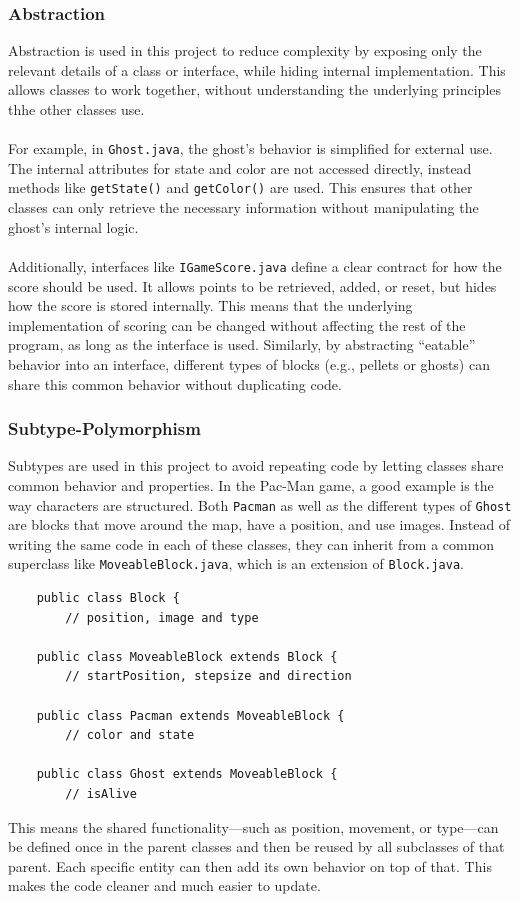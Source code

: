 \documentclass[a4paper,5pt]{article}
\begin{document}
\subsubsection{Abstraction}
\label{sec:abstraction}
Abstraction is used in this project to reduce complexity by exposing only the relevant details of a class or interface, while hiding internal implementation. This allows classes to work together, without understanding the underlying principles thhe other classes use.
\\\\
For example, in \texttt{Ghost.java}, the ghost’s behavior is simplified for external use. The internal attributes for state and color are not accessed directly, instead methods like \texttt{getState()} and \texttt{getColor()} are used. This ensures that other classes can only retrieve the necessary information without manipulating the ghost’s internal logic.
\\\\
Additionally, interfaces like \texttt{IGameScore.java} define a clear contract for how the score should be used. It allows points to be retrieved, added, or reset, but hides how the score is stored internally. This means that the underlying implementation of scoring can be changed without affecting the rest of the program, as long as the interface is used. Similarly, by abstracting “eatable” behavior into an interface, different types of blocks (e.g., pellets or ghosts) can share this common behavior without duplicating code.
\newpage

\subsubsection{Subtype-Polymorphism}
Subtypes are used in this project to avoid repeating code by letting classes share common behavior and properties. In the Pac-Man game, a good example is the way characters are structured. Both \texttt{Pacman} as well as the different types of \texttt{Ghost} are blocks that move around the map, have a position, and use images. Instead of writing the same code in each of these classes, they can inherit from a common superclass like \texttt{MoveableBlock.java}, which is an extension of \texttt{Block.java}.
\begin{verbatim}
    public class Block {
        // position, image and type
    
    public class MoveableBlock extends Block {
        // startPosition, stepsize and direction

    public class Pacman extends MoveableBlock {
        // color and state

    public class Ghost extends MoveableBlock {
        // isAlive
\end{verbatim}
\noindent This means the shared functionality—such as position, movement, or type—can be defined once in the parent classes and then be reused by all subclasses of that parent. Each specific entity can then add its own behavior on top of that. This makes the code cleaner and much easier to update.
\end{document}
